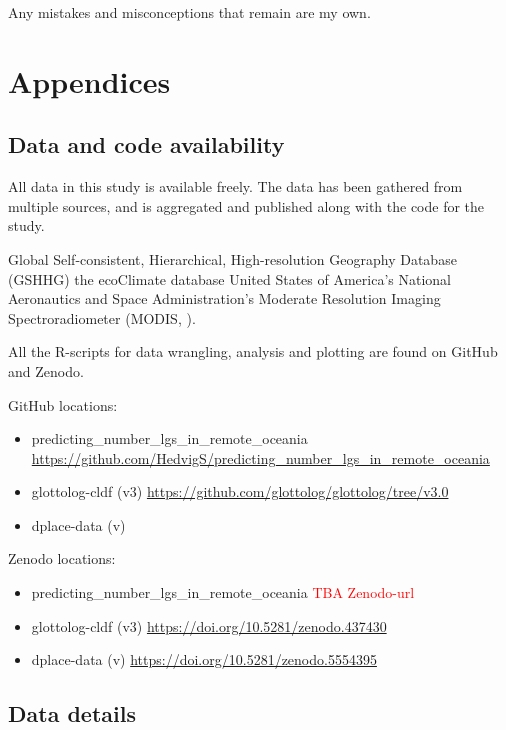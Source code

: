 \documentclass[a4paper,10pt]{article} %
\begin{document}
Any mistakes and misconceptions that remain are my own.

\newpage
\singlespacing
\appendix
\section*{Appendices}
\renewcommand{\thesubsection}{\Alph{subsection}}

\subsection{Data and code availability}
\label{supp_data_availability}

All data in this study is available freely. The data has been gathered from multiple sources, and is aggregated and published along with the code for the study.

Global Self-consistent, Hierarchical, High-resolution Geography Database (GSHHG) \citep{wessel1996global}
the ecoClimate database \citep{ecoclimate} 
United States of America's National Aeronautics and Space Administration's Moderate Resolution Imaging Spectroradiometer (MODIS, \citet{running2021modis_terra, running2021modis_aqua}).

All the R-scripts for data wrangling, analysis and plotting are found on GitHub and Zenodo.

GitHub locations:
\begin{itemize}
\item predicting\_number\_lgs\_in\_remote\_oceania  \url{https://github.com/HedvigS/predicting_number_lgs_in_remote_oceania}
\item glottolog-cldf (v3) \url{https://github.com/glottolog/glottolog/tree/v3.0}
\item dplace-data (v) \url{}
\end{itemize}

Zenodo locations:
\begin{itemize}
\item predicting\_number\_lgs\_in\_remote\_oceania  \textcolor{red}{TBA Zenodo-url}
\item glottolog-cldf (v3) \url{https://doi.org/10.5281/zenodo.437430}
\item dplace-data (v) \url{https://doi.org/10.5281/zenodo.5554395}
\end{itemize}




\subsection{Data details}
\end{document}
